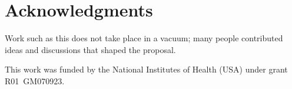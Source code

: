 
\section{Acknowledgments}

Work such as this does not take place in a vacuum; many people contributed ideas and discussions that shaped the proposal. 


This work was funded by the National Institutes of Health (USA) under grant R01~GM070923.
